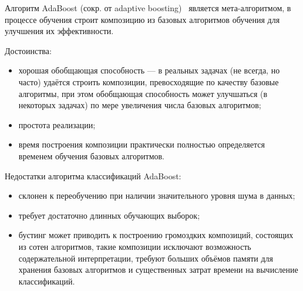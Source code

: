 Алгоритм AdaBoost (сокр. от adaptive boosting)~\cite{ada_boost} является мета-алгоритмом, в процессе обучения 
строит композицию из базовых алгоритмов обучения для улучшения их эффективности.

Достоинства:
\begin{itemize}
 \item хорошая обобщающая способность --- в реальных задачах (не всегда, но часто) удаётся строить композиции, 
превосходящие по качеству базовые алгоритмы, при этом обобщающая способность может улучшаться (в некоторых задачах) 
по мере увеличения числа базовых алгоритмов;
 \item простота реализации;
 \item время построения композиции практически полностью определяется временем обучения базовых алгоритмов.
\end{itemize}


Недостатки алгоритма классификаций AdaBoost:
\begin{itemize}
 \item склонен к переобучению при наличии значительного уровня шума в данных;
 \item требует достаточно длинных обучающих выборок;
 \item бустинг может приводить к построению громоздких композиций, состоящих из сотен алгоритмов, 
 такие композиции исключают возможность содержательной интерпретации, требуют больших объёмов памяти 
 для хранения базовых алгоритмов и существенных затрат времени на вычисление классификаций.
\end{itemize}